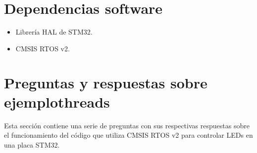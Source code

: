 \documentclass[letterpaper,10pt,english]{sphinxmanual}
\begin{document}
\begin{sphinxVerbatim}[commandchars=\\\{\}]
\end{sphinxVerbatim}


\section{Dependencias software}
\label{\detokenize{ejemplothreads:dependencias-software}}\begin{itemize}
\item {} 
\sphinxAtStartPar
Librería HAL de STM32.

\item {} 
\sphinxAtStartPar
CMSIS RTOS v2.

\end{itemize}


\section{Preguntas y respuestas sobre ejemplothreads}
\label{\detokenize{ejemplothreads:preguntas-y-respuestas-sobre-ejemplothreads}}
\sphinxAtStartPar
Esta sección contiene una serie de preguntas con sus respectivas respuestas sobre el funcionamiento del código que utiliza CMSIS RTOS v2 para controlar LEDs en una placa STM32.
\end{document}
